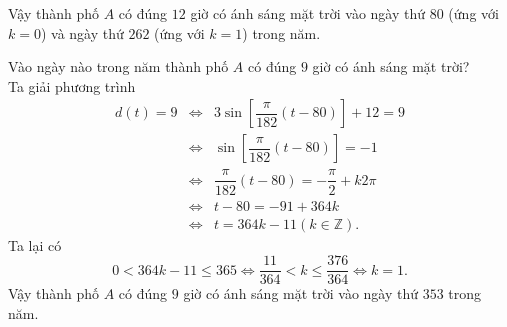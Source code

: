 \begin{bt}
{\begin{listEX}[1]
			Vậy thành phố $A$ có đúng $12$ giờ có ánh sáng mặt trời vào ngày thứ $80$ (ứng với $k=0$) và ngày thứ $262$ (ứng với $k=1$) trong năm.
			\item Vào ngày nào trong năm thành phố $A$ có đúng $9$ giờ có ánh sáng mặt trời?\\
			Ta giải phương trình 
			\begin{eqnarray*}
				d(t)=9 &\Leftrightarrow& 3\sin\left[\dfrac{\pi}{182}(t-80)\right] +12=9 \\
				&\Leftrightarrow& \sin\left[\dfrac{\pi}{182}(t-80)\right]=-1\\
				&\Leftrightarrow& \dfrac{\pi}{182}(t-80) =-\dfrac{\pi}{2}+k2 \pi \\
				&\Leftrightarrow& t-80 = -91+364k\\
				&\Leftrightarrow& t= 364k-11 (k\in \mathbb{Z}).	
			\end{eqnarray*}
			Ta lại có  \[0<364k-11 \le 365 \Leftrightarrow \dfrac{11}{364}<k \le \dfrac{376}{364} \Leftrightarrow k=1.\]
			Vậy thành phố $A$ có đúng $9$ giờ có ánh sáng mặt trời vào ngày thứ $353$ trong năm.
		\end{listEX}
	}
\end{bt}

